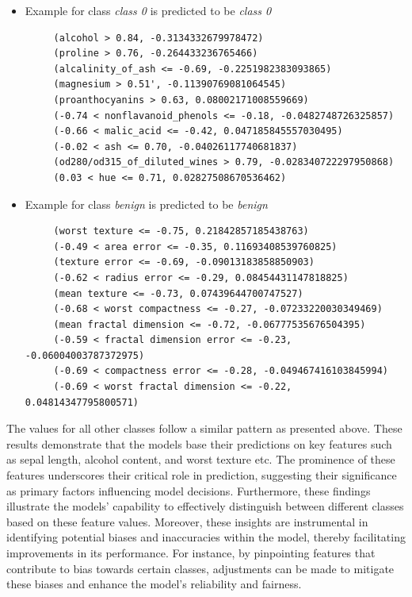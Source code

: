 \documentclass[journal, a4paper]{IEEEtran}
\begin{document}
\begin{itemize}
    \item Example for class \textit{class 0} is predicted to be \textit{class 0} \\
          {\tiny
          \begin{verbatim}
     (alcohol > 0.84, -0.3134332679978472)
     (proline > 0.76, -0.264433236765466)
     (alcalinity_of_ash <= -0.69, -0.2251982383093865)
     (magnesium > 0.51', -0.11390769081064545)
     (proanthocyanins > 0.63, 0.08002171008559669)
     (-0.74 < nonflavanoid_phenols <= -0.18, -0.0482748726325857)
     (-0.66 < malic_acid <= -0.42, 0.047185845557030495)
     (-0.02 < ash <= 0.70, -0.04026117740681837)
     (od280/od315_of_diluted_wines > 0.79, -0.028340722297950868)
     (0.03 < hue <= 0.71, 0.02827508670536462)
    \end{verbatim}
          }
\end{itemize}

\begin{itemize}
    \item Example for class \textit{benign} is predicted to be \textit{benign} \\
          {\tiny
          \begin{verbatim}
     (worst texture <= -0.75, 0.21842857185438763)
     (-0.49 < area error <= -0.35, 0.11693408539760825)
     (texture error <= -0.69, -0.09013183858850903)
     (-0.62 < radius error <= -0.29, 0.08454431147818825)
     (mean texture <= -0.73, 0.07439644700747527)
     (-0.68 < worst compactness <= -0.27, -0.07233220030349469)
     (mean fractal dimension <= -0.72, -0.06777535676504395)
     (-0.59 < fractal dimension error <= -0.23, -0.06004003787372975)
     (-0.69 < compactness error <= -0.28, -0.049467416103845994)
     (-0.69 < worst fractal dimension <= -0.22, 0.04814347795800571)
    \end{verbatim}
          }
\end{itemize}

The values for all other classes follow a similar pattern as presented above.
These results demonstrate that the models base their predictions on key features such as sepal length, alcohol content, and worst texture etc.
The prominence of these features underscores their critical role in prediction, suggesting their significance as primary factors influencing model decisions.
Furthermore, these findings illustrate the models' capability to effectively distinguish between different classes based on these feature values.
Moreover, these insights are instrumental in identifying potential biases and inaccuracies within the model, thereby facilitating improvements in its performance.
For instance, by pinpointing features that contribute to bias towards certain classes, adjustments can be made to mitigate these biases and enhance the model's reliability and fairness.
\end{document}
